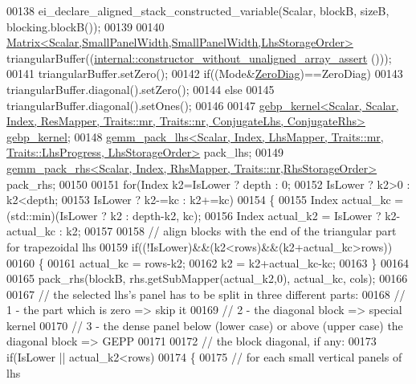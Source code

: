 \begin{DoxyCode}
00138     ei\_declare\_aligned\_stack\_constructed\_variable(Scalar, blockB, sizeB, blocking.blockB());
00139 
00140     \hyperlink{group___core___module_class_eigen_1_1_matrix}{Matrix<Scalar,SmallPanelWidth,SmallPanelWidth,LhsStorageOrder>}
       triangularBuffer((\hyperlink{struct_eigen_1_1internal_1_1constructor__without__unaligned__array__assert}{internal::constructor\_without\_unaligned\_array\_assert}
      ()));
00141     triangularBuffer.setZero();
00142     \textcolor{keywordflow}{if}((Mode&\hyperlink{group__enums_gga39e3366ff5554d731e7dc8bb642f83cda884ff7240392e85aa6e4b3c957e36483}{ZeroDiag})==ZeroDiag)
00143       triangularBuffer.diagonal().setZero();
00144     \textcolor{keywordflow}{else}
00145       triangularBuffer.diagonal().setOnes();
00146 
00147     
      \hyperlink{struct_eigen_1_1internal_1_1gebp__kernel}{gebp\_kernel<Scalar, Scalar, Index, ResMapper, Traits::mr, Traits::nr, ConjugateLhs, ConjugateRhs>}
       \hyperlink{struct_eigen_1_1internal_1_1gebp__kernel}{gebp\_kernel};
00148     
      \hyperlink{struct_eigen_1_1internal_1_1gemm__pack__lhs}{gemm\_pack\_lhs<Scalar, Index, LhsMapper, Traits::mr, Traits::LhsProgress, LhsStorageOrder>}
       pack\_lhs;
00149     \hyperlink{struct_eigen_1_1internal_1_1gemm__pack__rhs}{gemm\_pack\_rhs<Scalar, Index, RhsMapper, Traits::nr,RhsStorageOrder>}
       pack\_rhs;
00150 
00151     \textcolor{keywordflow}{for}(Index k2=IsLower ? depth : 0;
00152         IsLower ? k2>0 : k2<depth;
00153         IsLower ? k2-=kc : k2+=kc)
00154     \{
00155       Index actual\_kc = (std::min)(IsLower ? k2 : depth-k2, kc);
00156       Index actual\_k2 = IsLower ? k2-actual\_kc : k2;
00157 
00158       \textcolor{comment}{// align blocks with the end of the triangular part for trapezoidal lhs}
00159       \textcolor{keywordflow}{if}((!IsLower)&&(k2<rows)&&(k2+actual\_kc>rows))
00160       \{
00161         actual\_kc = rows-k2;
00162         k2 = k2+actual\_kc-kc;
00163       \}
00164 
00165       pack\_rhs(blockB, rhs.getSubMapper(actual\_k2,0), actual\_kc, cols);
00166 
00167       \textcolor{comment}{// the selected lhs's panel has to be split in three different parts:}
00168       \textcolor{comment}{//  1 - the part which is zero => skip it}
00169       \textcolor{comment}{//  2 - the diagonal block => special kernel}
00170       \textcolor{comment}{//  3 - the dense panel below (lower case) or above (upper case) the diagonal block => GEPP}
00171 
00172       \textcolor{comment}{// the block diagonal, if any:}
00173       \textcolor{keywordflow}{if}(IsLower || actual\_k2<rows)
00174       \{
00175         \textcolor{comment}{// for each small vertical panels of lhs}

\end{DoxyCode}
